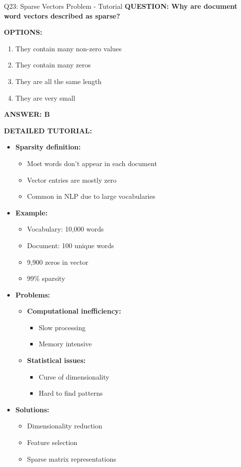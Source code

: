 \documentclass[8pt]{beamer}
\begin{document}
	\begin{frame}{Q23: Sparse Vectors Problem - Tutorial}
		\fontsize{6.5}{7.5}\selectfont
		\textbf{QUESTION: Why are document word vectors described as sparse?}
		
		\vspace{0.1cm}
		\textbf{OPTIONS:}
		\begin{enumerate}
			\item They contain many non-zero values
			\item They contain many zeros
			\item They are all the same length
			\item They are very small
		\end{enumerate}
		
		\vspace{0.1cm}
		\textcolor{myblue}{\textbf{ANSWER: B}}
		
		\vspace{0.1cm}
		\textbf{DETAILED TUTORIAL:}
		\begin{itemize}
			\item \textbf{Sparsity definition:}
			\begin{itemize}
				\item Most words don't appear in each document
				\item Vector entries are mostly zero
				\item Common in NLP due to large vocabularies
			\end{itemize}
			\item \textbf{Example:}
			\begin{itemize}
				\item Vocabulary: 10,000 words
				\item Document: 100 unique words
				\item 9,900 zeros in vector
				\item 99\% sparsity
			\end{itemize}
			\item \textbf{Problems:}
			\begin{itemize}
				\item \textbf{Computational inefficiency:}
				\begin{itemize}
					\item Slow processing
					\item Memory intensive
				\end{itemize}
				\item \textbf{Statistical issues:}
				\begin{itemize}
					\item Curse of dimensionality
					\item Hard to find patterns
				\end{itemize}
			\end{itemize}
			\item \textbf{Solutions:}
			\begin{itemize}
				\item Dimensionality reduction
				\item Feature selection
				\item Sparse matrix representations
			\end{itemize}
		\end{itemize}
		

\end{frame}
\end{document}
